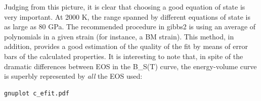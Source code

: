 \documentclass[a4paper]{article}
\begin{document}
\noindent{}

Judging from this picture, it is clear that choosing a good equation
of state is very important. At 2000 K, the range spanned by different
equations of state is as large as 80 GPa. The recommended procedure in
gibbs2 is using an average of polynomials in a given strain (for
instance, a BM strain). This method, in addition, provides a good
estimation of the quality of the fit by means of error bars of the
calculated properties. It is interesting to note that, in spite of the
dramatic differences between EOS in the B\_S(T) curve, the
energy-volume curve is superbly represented by \emph{all} the EOS used:
%
\asciilist
\begin{lstlisting}
gnuplot c_efit.pdf
\end{lstlisting}

\noindent{}
\end{document}
